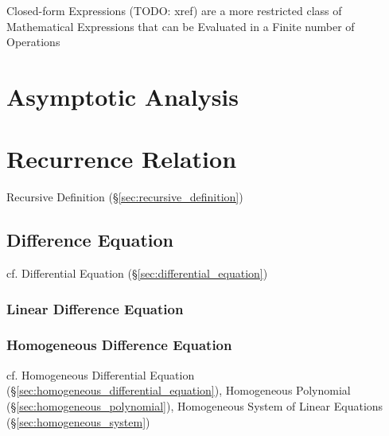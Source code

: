 Closed-form Expressions (TODO: xref) are a more restricted class of Mathematical
Expressions that can be Evaluated in a Finite number of Operations



\section{Asymptotic Analysis}\label{sec:asymptotic_analysis}




\section{Recurrence Relation}\label{sec:recurrence_relation}

Recursive Definition (\S\ref{sec:recursive_definition})



\subsection{Difference Equation}\label{sec:difference_equation}

\fist cf. Differential Equation (\S\ref{sec:differential_equation})



\subsubsection{Linear Difference Equation}\label{sec:linear_difference_equation}

\subsubsection{Homogeneous Difference Equation}
\label{sec:homogeneous_difference_equation}

cf. Homogeneous Differential Equation
(\S\ref{sec:homogeneous_differential_equation}), Homogeneous Polynomial
(\S\ref{sec:homogeneous_polynomial}), Homogeneous System of Linear Equations
(\S\ref{sec:homogeneous_system})



